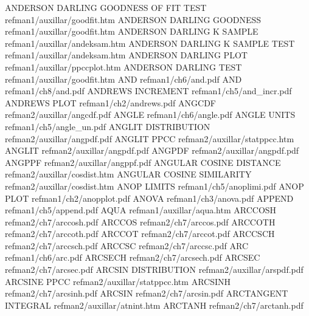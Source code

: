 ANDERSON DARLING GOODNESS OF FIT TEST   refman1/auxillar/goodfit.htm
ANDERSON DARLING GOODNESS               refman1/auxillar/goodfit.htm
ANDERSON DARLING K SAMPLE               refman1/auxillar/andeksam.htm
ANDERSON DARLING K SAMPLE TEST          refman1/auxillar/andeksam.htm
ANDERSON DARLING PLOT                   refman1/auxillar/ppccplot.htm
ANDERSON DARLING TEST                   refman1/auxillar/goodfit.htm
AND                                     refman1/ch6/and.pdf
AND                                     refman1/ch8/and.pdf
ANDREWS INCREMENT                       refman1/ch5/and_incr.pdf
ANDREWS PLOT                            refman1/ch2/andrews.pdf
ANGCDF                                  refman2/auxillar/angcdf.pdf
ANGLE                                   refman1/ch6/angle.pdf
ANGLE UNITS                             refman1/ch5/angle_un.pdf
ANGLIT DISTRIBUTION                     refman2/auxillar/angpdf.pdf
ANGLIT PPCC                             refman2/auxillar/statppcc.htm
ANGLIT                                  refman2/auxillar/angpdf.pdf
ANGPDF                                  refman2/auxillar/angpdf.pdf
ANGPPF                                  refman2/auxillar/angppf.pdf
ANGULAR COSINE DISTANCE                 refman2/auxillar/cosdist.htm
ANGULAR COSINE SIMILARITY               refman2/auxillar/cosdist.htm
ANOP LIMITS                             refman1/ch5/anoplimi.pdf
ANOP PLOT                               refman1/ch2/anopplot.pdf
ANOVA                                   refman1/ch3/anova.pdf
APPEND                                  refman1/ch5/append.pdf
AQUA                                    refman1/auxillar/aqua.htm
ARCCOSH                                 refman2/ch7/arccosh.pdf
ARCCOS                                  refman2/ch7/arccos.pdf
ARCCOTH                                 refman2/ch7/arccoth.pdf
ARCCOT                                  refman2/ch7/arccot.pdf
ARCCSCH                                 refman2/ch7/arccsch.pdf
ARCCSC                                  refman2/ch7/arccsc.pdf
ARC                                     refman1/ch6/arc.pdf
ARCSECH                                 refman2/ch7/arcsech.pdf
ARCSEC                                  refman2/ch7/arcsec.pdf
ARCSIN DISTRIBUTION                     refman2/auxillar/arspdf.pdf
ARCSINE PPCC                            refman2/auxillar/statppcc.htm
ARCSINH                                 refman2/ch7/arcsinh.pdf
ARCSIN                                  refman2/ch7/arcsin.pdf
ARCTANGENT INTEGRAL                     refman2/auxillar/atnint.htm
ARCTANH                                 refman2/ch7/arctanh.pdf
